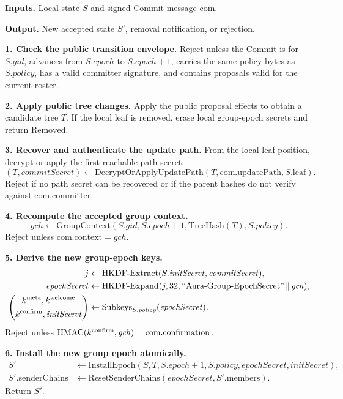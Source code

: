 \documentclass[preprint,12pt]{elsarticle}
\theoremstyle{definition}
\newcommand{\tech}[1]{\textnormal{#1}}
\newcommand{\domain}[1]{\textnormal{``#1''}}
\renewcommand{\mathsf}[1]{\mathrm{#1}}
\newcommand{\HKDF}{\tech{HKDF}}
\newcommand{\HMAC}{\tech{HMAC}}
\newcommand{\concat}{\,\|\,}
\newcommand{\gid}{\mathit{gid}}
\newcommand{\epoch}{\mathit{epoch}}
\newcommand{\gch}{\mathit{gch}}
\newcommand{\initsec}{\mathit{initSecret}}
\newcommand{\commitsec}{\mathit{commitSecret}}
\newcommand{\epochsec}{\mathit{epochSecret}}
\newcommand{\policy}{\mathit{policy}}
\begin{document}
\begingroup
\LinesNotNumbered
\SetAlgoNoLine
\begin{algorithm}[!tbp]
\caption{Process an UpdatePath-bearing group-epoch Commit message.}\label{alg:process-commit}
\footnotesize
\textbf{Inputs.}
Local state $S$ and signed Commit message $\mathsf{com}$.

\textbf{Output.}
New accepted state $S'$, removal notification, or rejection.
\vspace{0.25\baselineskip}

\textbf{1. Check the public transition envelope.}
Reject unless the Commit is for $S.\gid$, advances from $S.\epoch$ to
$S.\epoch+1$, carries the same policy bytes as $S.\policy$, has a valid
committer signature, and contains proposals valid for the current roster.

\textbf{2. Apply public tree changes.}
Apply the public proposal effects to obtain a candidate tree $T$. If the local
leaf is removed, erase local group-epoch secrets and return $\mathrm{Removed}$.

\textbf{3. Recover and authenticate the update path.}
From the local leaf position, decrypt or apply the first reachable path secret:
\[
  (T,\commitsec)\gets
  \mathrm{DecryptOrApplyUpdatePath}(T,\mathsf{com.updatePath},S.\mathrm{leaf}).
\]
Reject if no path secret can be recovered or if the parent hashes do not verify
against $\mathsf{com.committer}$.

\textbf{4. Recompute the accepted group context.}
\[
  \gch\gets \mathsf{GroupContext}(S.\gid,S.\epoch+1,
  \mathsf{TreeHash}(T),S.\policy).
\]
Reject unless $\mathsf{com.context}=\gch$.

\textbf{5. Derive the new group-epoch keys.}
\[
\begin{aligned}
j&\gets \HKDF\text{-}\mathrm{Extract}(S.\initsec,\commitsec),\\
\epochsec&\gets \HKDF\text{-}\mathrm{Expand}(j,32,
  \domain{Aura-Group-EpochSecret}\concat\gch),\\
\left(\begin{gathered}
  k^{\mathsf{meta}},k^{\mathsf{welcome}}\\
  k^{\mathsf{confirm}},\initsec
\end{gathered}\right)
  &\gets \mathrm{Subkeys}_{S.\policy}(\epochsec).
\end{aligned}
\]
Reject unless $\HMAC(k^{\mathsf{confirm}},\gch)=\mathsf{com.confirmation}$.

\textbf{6. Install the new group epoch atomically.}
\[
\begin{aligned}
S'&\gets \mathrm{InstallEpoch}(S,T,S.\epoch+1,S.\policy,\epochsec,\initsec),\\
S'.\mathrm{senderChains}&\gets
  \mathrm{ResetSenderChains}(\epochsec,S'.\mathrm{members}).
\end{aligned}
\]
Return $S'$.
\end{algorithm}
\endgroup
\FloatBarrier
\end{document}
